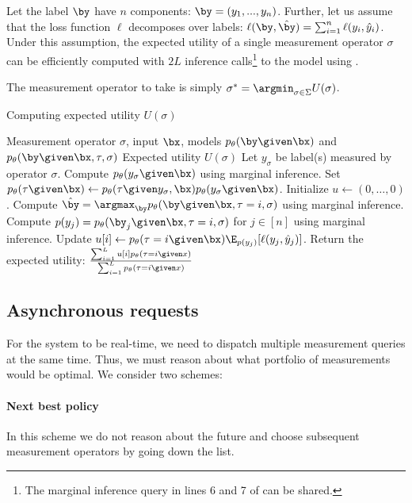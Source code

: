 Let the label $\by$ have $n$ components: $\by = (y_1, ..., y_n)$.
Further, let us assume that the loss function $\ell$ decomposes over labels: $\ell(\by, \byt) = \sum_{i=1}^n \ell(y_i, \yt_i)$. 
Under this assumption, the expected utility of a single measurement operator $\sigma$ can be efficiently computed with $2L$ inference calls\footnote{The marginal inference query in lines 6 and 7 of  can be shared.} to the model using .

The measurement operator to take is simply $\sigma^* = \argmin_{\sigma \in \Sigma} U(\sigma)$.

\begin{algorithm}
\renewcommand{\algorithmicrequire}{\textbf{Input:}}
\renewcommand{\algorithmicensure}{\textbf{Output:}}
  \caption{Computing expected utility $U(\sigma)$}
  \label{algo:expected-utility}
  \begin{algorithmic}[1]
    \REQUIRE Measurement operator $\sigma$, input $\bx$, models $p_\theta(\by \given \bx)$ and $p_\theta(\by \given \bx, \tau, \sigma)$
    \ENSURE Expected utility $U(\sigma)$
    \STATE Let $y_\sigma$ be label(s) measured by operator $\sigma$.
    \STATE Compute $p_\theta(y_\sigma \given \bx)$ using marginal inference.
    \STATE Set $p_\theta(\tau \given \bx) \gets p_\theta(\tau \given y_\sigma, \bx) p_\theta(y_\sigma \given \bx)$.
    \STATE Initialize $u \gets (0, \dots, 0)$.
    \STATE Compute $\byt = \argmax_{\by} p_\theta(\by \given \bx, \tau = i, \sigma)$ using marginal inference.
    \STATE Compute $p(y_j) = p_\theta(\by_j \given \bx, \tau = i, \sigma)$ for $j \in [n]$ using marginal inference.
    \STATE Update $u[i] \gets p_\theta(\tau = i \given \bx) \E_{p(y_j)}[\ell(y_j, \yt_j)]$.
    \ENDFOR
    \STATE Return the expected utility: $\frac{\sum_{i=1}^L u[i] p_\theta(\tau = i \given x)}{\sum_{i=1}^L p_\theta(\tau = i \given x)}$
  \end{algorithmic}
\end{algorithm}

\subsection{Asynchronous requests}

For the system to be real-time, we need to dispatch multiple measurement queries at the same time.
Thus, we must reason about what portfolio of measurements would be optimal.
We consider two schemes:

\paragraph{Next best policy}
In this scheme we do not reason about the future and choose subsequent measurement operators by going down the list.

